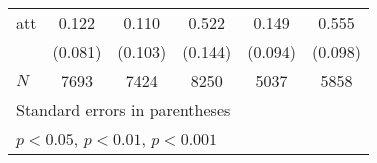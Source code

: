 {\begin{tabular}{l*{5}{c}}
att         &       0.122         &       0.110         &       0.522\sym{***}&       0.149         &       0.555\sym{***}\\
            &     (0.081)         &     (0.103)         &     (0.144)         &     (0.094)         &     (0.098)         \\
\hline
\(N\)       &        7693         &        7424         &        8250         &        5037         &        5858         \\
\hline\hline
\multicolumn{6}{l}{\footnotesize Standard errors in parentheses}\\
\multicolumn{6}{l}{\footnotesize \sym{*} \(p<0.05\), \sym{**} \(p<0.01\), \sym{***} \(p<0.001\)}\\
\end{tabular}
}
